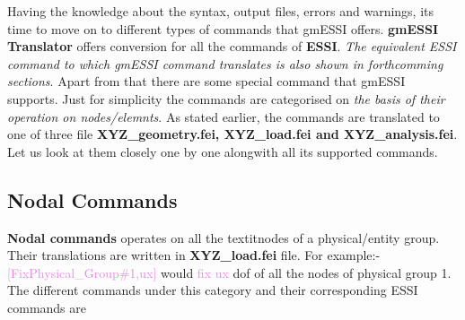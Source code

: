 \documentclass[11pt]{article}
\begin{document}
Having the knowledge about the syntax, output files, errors and warnings, its
time to move on to different types of commands that gmESSI offers.
\textbf{gmESSI Translator} offers conversion for all the commands of
\textbf{ESSI}. \textit{The equivalent ESSI command to which gmESSI command
translates is also shown in forthcomming sections}. Apart from that there are
some special command that gmESSI supports. Just for simplicity  the commands
are categorised on \textit{the basis of their operation on nodes/elemnts}. As
stated earlier, the commands are translated to one of three file
\textbf{XYZ\_geometry.fei, XYZ\_load.fei and XYZ\_analysis.fei}. Let us look
at them closely one by one alongwith all its supported commands.

\subsection{Nodal Commands}


\textbf{Nodal commands} operates on all the textit{nodes of a physical/entity
group}. Their translations are written in \textbf{XYZ\_load.fei} file. For
example:- \textcolor{violet}{[Fix{Physical\_Group\#1,ux}]} would
\textcolor{violet}{fix ux} dof of all the nodes of physical group 1. The
different commands under this category and their corresponding ESSI commands
are
\end{document}
